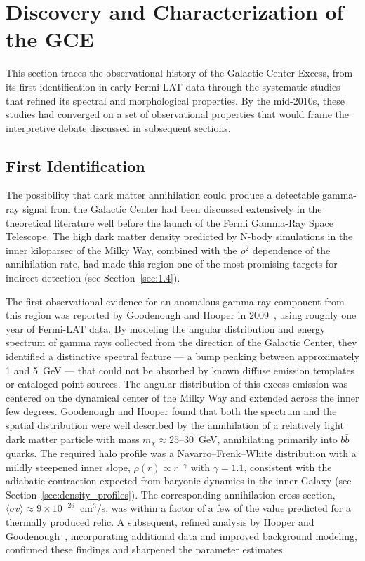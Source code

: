 
\section{Discovery and Characterization of the GCE}
\label{sec:4.2}

This section traces the observational history of the Galactic Center Excess, from its first identification in early Fermi-LAT data through the systematic studies that refined its spectral and morphological properties.
By the mid-2010s, these studies had converged on a set of observational properties that would frame the interpretive debate discussed in subsequent sections.

\subsection{First Identification}
\label{sec:4.2.1}

The possibility that dark matter annihilation could produce a detectable gamma-ray signal from the Galactic Center had been discussed extensively in the theoretical literature well before the launch of the Fermi Gamma-Ray Space Telescope.
The high dark matter density predicted by N-body simulations in the inner kiloparsec of the Milky Way, combined with the $\rho^2$ dependence of the annihilation rate, had made this region one of the most promising targets for indirect detection (see Section~\ref{sec:1.4}).

The first observational evidence for an anomalous gamma-ray component from this region was reported by Goodenough and Hooper in 2009~\cite{Goodenough:2009gk}, using roughly one year of Fermi-LAT data.
By modeling the angular distribution and energy spectrum of gamma rays collected from the direction of the Galactic Center, they identified a distinctive spectral feature --- a bump peaking between approximately 1 and 5~GeV --- that could not be absorbed by known diffuse emission templates or cataloged point sources.
The angular distribution of this excess emission was centered on the dynamical center of the Milky Way and extended across the inner few degrees.
Goodenough and Hooper found that both the spectrum and the spatial distribution were well described by the annihilation of a relatively light dark matter particle with mass $m_\chi \approx 25$--$30$~GeV, annihilating primarily into $b\bar{b}$ quarks.
The required halo profile was a Navarro--Frenk--White distribution with a mildly steepened inner slope, $\rho(r) \propto r^{-\gamma}$ with $\gamma = 1.1$, consistent with the adiabatic contraction expected from baryonic dynamics in the inner Galaxy (see Section~\ref{sec:density_profiles}).
The corresponding annihilation cross section, $\langle \sigma v \rangle \approx 9 \times 10^{-26}$~cm$^3$/s, was within a factor of a few of the value predicted for a thermally produced relic.
A subsequent, refined analysis by Hooper and Goodenough~\cite{Hooper:2010mq}, incorporating additional data and improved background modeling, confirmed these findings and sharpened the parameter estimates.

